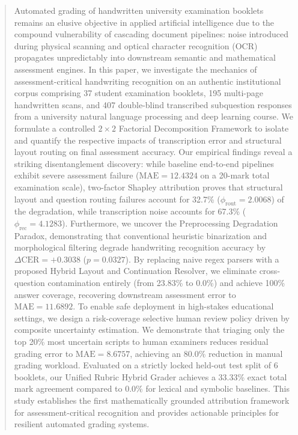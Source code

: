 \documentclass[journal]{IEEEtran}
\begin{document}
\begin{abstract}
Automated grading of handwritten university examination booklets remains an elusive objective in applied artificial intelligence due to the compound vulnerability of cascading document pipelines: noise introduced during physical scanning and optical character recognition (OCR) propagates unpredictably into downstream semantic and mathematical assessment engines. In this paper, we investigate the mechanics of assessment-critical handwriting recognition on an authentic institutional corpus comprising 37 student examination booklets, 195 multi-page handwritten scans, and 407 double-blind transcribed subquestion responses from a university natural language processing and deep learning course. We formulate a controlled $2\times 2$ Factorial Decomposition Framework to isolate and quantify the respective impacts of transcription error and structural layout routing on final assessment accuracy. Our empirical findings reveal a striking disentanglement discovery: while baseline end-to-end pipelines exhibit severe assessment failure ($\text{MAE} = 12.4324$ on a 20-mark total examination scale), two-factor Shapley attribution proves that structural layout and question routing failures account for 32.7\% ($\phi_{\text{rout}} = 2.0068$) of the degradation, while transcription noise accounts for 67.3\% ($\phi_{\text{rec}} = 4.1283$). Furthermore, we uncover the Preprocessing Degradation Paradox, demonstrating that conventional heuristic binarization and morphological filtering degrade handwriting recognition accuracy by $\Delta\text{CER} = +0.3038$ ($p = 0.0327$). By replacing naive regex parsers with a proposed Hybrid Layout and Continuation Resolver, we eliminate cross-question contamination entirely (from 23.83\% to 0.0\%) and achieve 100\% answer coverage, recovering downstream assessment error to $\text{MAE} = 11.6892$. To enable safe deployment in high-stakes educational settings, we design a risk-coverage selective human review policy driven by composite uncertainty estimation. We demonstrate that triaging only the top 20\% most uncertain scripts to human examiners reduces residual grading error to $\text{MAE} = 8.6757$, achieving an 80.0\% reduction in manual grading workload. Evaluated on a strictly locked held-out test split of 6 booklets, our Unified Rubric Hybrid Grader achieves a 33.33\% exact total mark agreement compared to 0.0\% for lexical and symbolic baselines. This study establishes the first mathematically grounded attribution framework for assessment-critical recognition and provides actionable principles for resilient automated grading systems.
\end{abstract}
\end{document}
